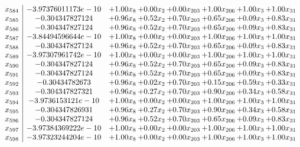 \documentclass[8pt]{article}
\begin{document}
\[\begin{array}{c| c c@{\hskip 2pt} c@{\hskip 2pt} c@{\hskip 2pt} c@{\hskip 2pt} c@{\hskip 2pt} c@{\hskip 2pt} }
 x_{584}   &  -3.97376011173e-10 & +  1.00 x_{8} & +  0.00 x_{2} & +  0.00 x_{203} & +  1.00 x_{206} & +  1.00 x_{3} & +  1.00 x_{31}\\
 x_{585}   &  -0.304347827124 & +  0.96 x_{8} & +  0.52 x_{2} & +  0.70 x_{203} & +  0.65 x_{206} & +  0.09 x_{3} & +  0.83 x_{31}\\
 x_{586}   &  -0.304347827124 & +  0.96 x_{8} & +  0.52 x_{2} & +  0.70 x_{203} & +  0.65 x_{206} & +  0.09 x_{3} & +  0.83 x_{31}\\
 x_{587}   &  -3.84494596644e-10 & +  1.00 x_{8} & +  0.00 x_{2} & +  0.00 x_{203} & +  1.00 x_{206} & +  1.00 x_{3} & +  1.00 x_{31}\\
 x_{588}   &  -0.304347827124 & +  0.96 x_{8} & +  0.52 x_{2} & +  0.70 x_{203} & +  0.65 x_{206} & +  0.09 x_{3} & +  0.83 x_{31}\\
 x_{589}   &  -3.97307961742e-10 & +  1.00 x_{8} & +  0.00 x_{2} & +  0.00 x_{203} & +  1.00 x_{206} & +  1.00 x_{3} & +  1.00 x_{31}\\
 x_{590}   &  -0.304347827124 & +  0.96 x_{8} & +  0.52 x_{2} & +  0.70 x_{203} & +  0.65 x_{206} & +  0.09 x_{3} & +  0.83 x_{31}\\
 x_{591}   &  -0.304347827124 & +  0.96 x_{8} & +  0.52 x_{2} & +  0.70 x_{203} & +  0.65 x_{206} & +  0.09 x_{3} & +  0.83 x_{31}\\
 x_{592}   &  -0.30434782673 & +  0.96 x_{8} & +  0.02 x_{2} & +  0.70 x_{203} & +  0.15 x_{206} & +  0.59 x_{3} & +  0.33 x_{31}\\
 x_{593}   &  -0.304347827321 & +  0.96 x_{8} & +  0.27 x_{2} & +  0.70 x_{203} & +  0.90 x_{206} & +  0.34 x_{3} & +  0.58 x_{31}\\
 x_{594}   &  -3.9736153121e-10 & +  1.00 x_{8} & +  0.00 x_{2} & +  0.00 x_{203} & +  1.00 x_{206} & +  1.00 x_{3} & +  1.00 x_{31}\\
 x_{595}   &  -0.304347826931 & +  0.96 x_{8} & +  0.27 x_{2} & +  0.70 x_{203} & +  0.90 x_{206} & +  0.34 x_{3} & +  0.58 x_{31}\\
 x_{596}   &  -0.304347827124 & +  0.96 x_{8} & +  0.52 x_{2} & +  0.70 x_{203} & +  0.65 x_{206} & +  0.09 x_{3} & +  0.83 x_{31}\\
 x_{597}   &  -3.97384369222e-10 & +  1.00 x_{8} & +  0.00 x_{2} & +  0.00 x_{203} & +  1.00 x_{206} & +  1.00 x_{3} & +  1.00 x_{31}\\
 x_{598}   &  -3.97323244204e-10 & +  1.00 x_{8} & +  0.00 x_{2} & +  0.00 x_{203} & +  1.00 x_{206} & +  1.00 x_{3} & +  1.00 x_{31}\\

\end{array}\]
\end{document}
